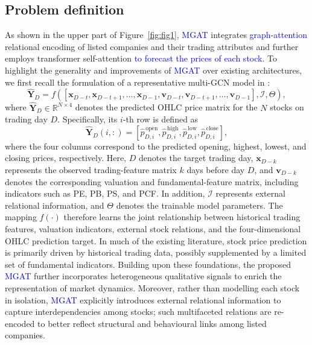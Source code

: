 \documentclass[pdflatex,sn-mathphys-num]{sn-jnl}%
\theoremstyle{thmstyleone}%
\theoremstyle{thmstyletwo}%
\theoremstyle{thmstylethree}%
\begin{document}
\subsection{Problem definition}
As shown in the upper part of Figure~\ref{fig:fig1}, \textcolor{blue}{MGAT} integrates \textcolor{blue}{graph-attention} relational encoding of listed companies and their trading attributes and further employs transformer self-attention \textcolor{blue}{to forecast the prices of each stock}.
To highlight the generality and improvements of \textcolor{blue}{MGAT} over existing architectures, we first recall the formulation of a representative multi-GCN model in \citep{Ye2020MultiGraph}:
\begin{equation}
\widehat{\mathbf{Y}}_{D}
=
f\!\left(
\left[
\mathbf{x}_{D-t},
\mathbf{x}_{D-t+1},
\ldots,
\mathbf{x}_{D-1},
\mathbf{v}_{D-t},
\mathbf{v}_{D-t+1},
\ldots,
\mathbf{v}_{D-1}
\right],
\mathcal{I},
\Theta
\right),
\label{eq:multigcn}
\end{equation}
where $\widehat{\mathbf{Y}}_{D}\in\mathbb{R}^{N\times 4}$
denotes the predicted OHLC price matrix for the $N$ stocks on
trading day $D$. Specifically, its $i$-th row is defined as
\[
\widehat{\mathbf{Y}}_{D}(i,:)
=
\left[
\widehat{p}^{\,\mathrm{open}}_{D,i},
\widehat{p}^{\,\mathrm{high}}_{D,i},
\widehat{p}^{\,\mathrm{low}}_{D,i},
\widehat{p}^{\,\mathrm{close}}_{D,i}
\right],
\]
where the four columns correspond to the predicted opening, highest,
lowest, and closing prices, respectively. Here, $D$ denotes the target
trading day, $\mathbf{x}_{D-k}$ represents the observed trading-feature
matrix $k$ days before day $D$, and $\mathbf{v}_{D-k}$ denotes the
corresponding valuation and fundamental-feature matrix, including
indicators such as PE, PB, PS, and PCF. In addition, $\mathcal{I}$
represents external relational information, and $\Theta$ denotes the
trainable model parameters. The mapping $f(\cdot)$ therefore learns the
joint relationship between historical trading features, valuation
indicators, external stock relations, and the four-dimensional OHLC
prediction target.
In much of the existing literature, stock price prediction is primarily driven by historical trading data, possibly supplemented by a limited set of fundamental indicators. Building upon these foundations, the proposed \textcolor{blue}{MGAT} further incorporates heterogeneous qualitative signals  to enrich the representation of market dynamics. Moreover, rather than modelling each stock in isolation, \textcolor{blue}{MGAT} explicitly introduces external relational information to capture interdependencies among stocks; such multifaceted relations are re-encoded to better reflect structural and behavioural links among listed companies.
\end{document}
